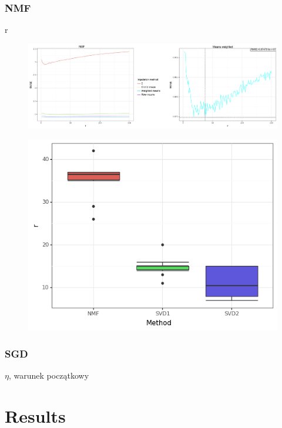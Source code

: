 \documentclass[11pt]{amsart}
\begin{document}
\subsubsection*{NMF} r
\begin{figure}[H]
\includegraphics[scale=0.45]{fig/syf/nmf_all}
\label{fig:figure}
\end{figure}



\begin{figure}[H]
\includegraphics[scale=0.6]{fig/syf/boxplot_reps}
\label{fig:figure}
\end{figure}

\subsubsection*{SGD} $\eta$, warunek początkowy

\section{Results}
\end{document}
